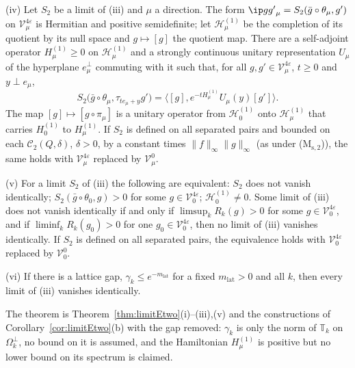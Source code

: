 \begin{theorem}
\textup{(iv)} Let $S_2$ be a limit of \textup{(iii)} and $\mu$ a direction.
The form $\ip g{g'}_\mu=S_2(\bar g\circ\theta_\mu,g')$ on
$\mathcal V^{4\varepsilon}_\mu$ is Hermitian and positive semidefinite; let
$\mathcal H^{(1)}_\mu$ be the completion of its quotient by its null space
and $g\mapsto[g]$ the quotient map. There are a self-adjoint operator
$H^{(1)}_\mu\ge0$ on $\mathcal H^{(1)}_\mu$ and a strongly continuous unitary
representation $U_\mu$ of the hyperplane $e_\mu^\perp$ commuting with it
such that, for all $g,g'\in\mathcal V^{4\varepsilon}_\mu$, $t\ge0$ and
$y\perp e_\mu$,
\[
S_2\bigl(\bar g\circ\theta_\mu,\tau_{te_\mu+y}g'\bigr)=\bigl\langle[g],
e^{-tH^{(1)}_\mu}U_\mu(y)[g']\bigr\rangle .
\]
The map $[g]\mapsto[g\circ\pi_\mu]$ is a unitary operator from
$\mathcal H^{(1)}_0$ onto $\mathcal H^{(1)}_\mu$ that carries $H^{(1)}_0$ to
$H^{(1)}_\mu$. If $S_2$ is defined on all separated pairs and bounded on each $\mathcal C_2(Q,\delta)$, $\delta>0$, by a constant times $\|f\|_\infty\|g\|_\infty$ (as under (M$_{\mathrm s,2}$)), the same holds
with $\mathcal V^{4\varepsilon}_\mu$ replaced by $\mathcal V^0_\mu$.

\textup{(v)} For a limit $S_2$ of \textup{(iii)} the following are
equivalent: $S_2$ does not vanish identically; $S_2(\bar g\circ\theta_0,g)>0$
for some $g\in\mathcal V^{4\varepsilon}_0$; $\mathcal H^{(1)}_0\ne0$. Some
limit of \textup{(iii)} does not vanish identically if and only if
$\limsup_kR_k(g)>0$ for some $g\in\mathcal V^{4\varepsilon}_0$, and if
$\liminf_kR_k(g_0)>0$ for one $g_0\in\mathcal V^{4\varepsilon}_0$, then no
limit of \textup{(iii)} vanishes identically. If $S_2$ is defined on all
separated pairs, the equivalence holds with $\mathcal V^{4\varepsilon}_0$
replaced by $\mathcal V^0_0$.

\textup{(vi)} If there is a lattice gap, $\gamma_k\le e^{-m_{\mathrm{lat}}}$
for a fixed $m_{\mathrm{lat}}>0$ and all $k$, then every limit of
\textup{(iii)} vanishes identically.
\end{theorem}

The theorem is Theorem~\ref{thm:limitEtwo}(i)--(iii),(v) and the
constructions of Corollary~\ref{cor:limitEtwo}(b) with the gap removed:
$\gamma_k$ is only the norm of $\mathbb T_k$ on $\Omega_k^\perp$, no bound
on it is assumed, and the Hamiltonian $H^{(1)}_\mu$ is positive but no
lower bound on its spectrum is claimed.

